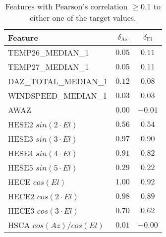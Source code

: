\begin{table}[!htbp]
    \centering
    \caption{Features with Pearson's correlation $\geq 0.1$ to either one of the target values.}
    \begin{tabular}{lcc}
        \toprule
        Feature &  $\delta_{\text{Az}}$ &  $\delta_{\text{El}}$  \\
        \midrule
        TEMP26\_MEDIAN\_1        &      $0.05$ &      $0.11$   \\
        TEMP27\_MEDIAN\_1        &      $0.05$ &      $0.11$   \\
        DAZ\_TOTAL\_MEDIAN\_1     &      $0.12$ &      $0.08$ \\
        WINDSPEED\_MEDIAN\_1     &      $0.03$ &      $0.03$  \\
        AWAZ                   &      $0.00$ &     $-0.01$  \\
        HESE2 $sin(2\cdot El)$    &      $0.56$ &      $0.54$ \\
        HESE3 $sin(3\cdot El)$    &      $0.97$ &      $0.90$ \\
        HESE4 $sin(4\cdot El)$    &      $0.91$ &      $0.82$ \\
        HESE5 $sin(5\cdot El)$    &      $0.29$ &      $0.22$  \\
        HECE  $cos(El)$        &      $1.00$ &      $0.92$ \\
        HECE2 $cos(2 \cdot El)$                 &      $0.98$ &      $0.89$  \\
        HECE3 $cos(3 \cdot El)$                 &      $0.70$ &      $0.62$  \\
        HSCA  $cos(Az)/cos(El)$                 &      $0.01$ &     $-0.00$  \\
        \bottomrule
        \end{tabular}
    \label{tab:raw_data_pearson}
\end{table}



